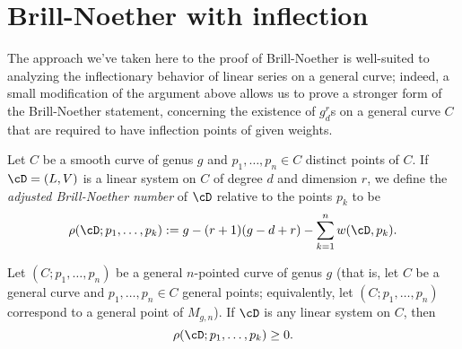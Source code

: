 \section{Brill-Noether with inflection}

The approach we've taken here to the proof of Brill-Noether is well-suited to analyzing the inflectionary behavior of linear series on a general curve; indeed, a small modification of the argument above allows us to prove a stronger form of the Brill-Noether statement, concerning the existence of $g^r_d$s on a general curve $C$ that are required to
 have inflection points of given weights.

\begin{definition}
Let $C$ be a smooth curve of genus $g$ and $p_1,\dots,p_n \in C$ distinct points of $C$. If $\cD = (L,V)$ is a linear system on $C$ of degree $d$ and dimension $r$, we define the \emph{adjusted Brill-Noether number} of $\cD$ relative to the points $p_k$ to be
$$
\rho(\cD; p_1,\dots,p_k) := g - (r+1)(g-d+r) - \sum_{k=1}^n w(\cD,p_k).
$$
\end{definition}


\begin{theorem}\label{Brill-Noether with inflection}
Let $(C;p_1,\dots,p_n)$ be a general $n$-pointed curve of genus $g$ (that is, let $C$ be a general curve and $p_1,\dots,p_n \in C$ general points; equivalently, let $(C;p_1,\dots,p_n)$ correspond to a general point of $M_{g,n}$). If $\cD$ is any linear system on $C$, then
$$
\rho(\cD; p_1,\dots,p_k) \geq 0.
$$
\end{theorem}

